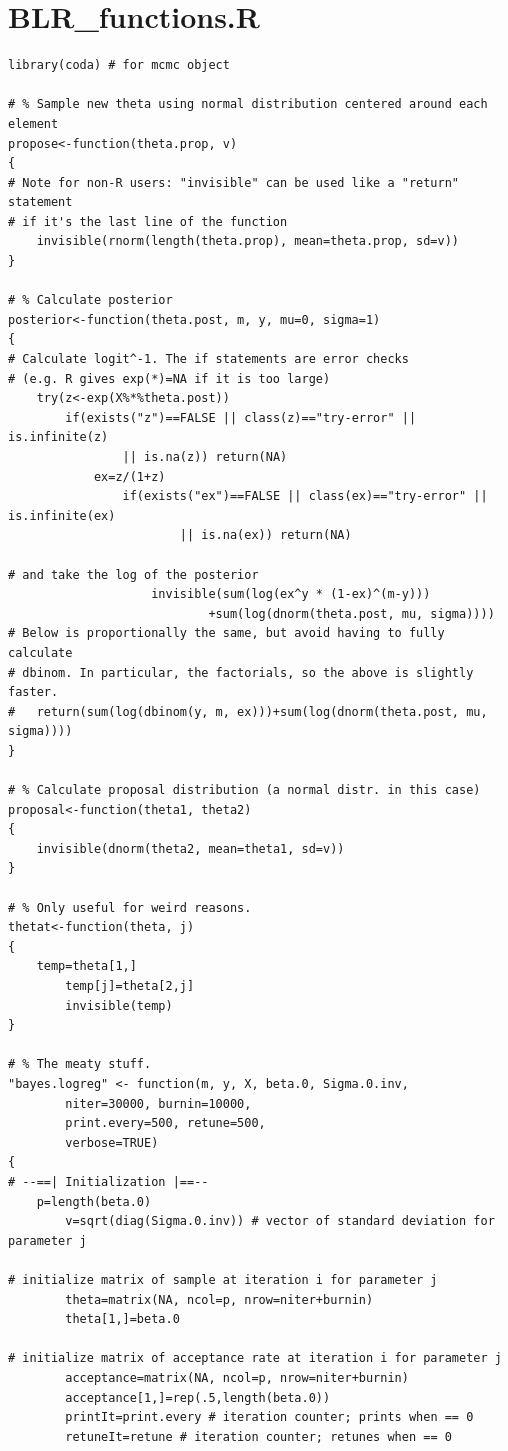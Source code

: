 \documentclass{article}
\begin{document}
\FloatBarrier
\newpage

\section{BLR\_functions.R}

\begin{verbatim}
library(coda) # for mcmc object

# % Sample new theta using normal distribution centered around each element
propose<-function(theta.prop, v)
{
# Note for non-R users: "invisible" can be used like a "return" statement
# if it's the last line of the function
	invisible(rnorm(length(theta.prop), mean=theta.prop, sd=v))
}

# % Calculate posterior
posterior<-function(theta.post, m, y, mu=0, sigma=1)
{
# Calculate logit^-1. The if statements are error checks
# (e.g. R gives exp(*)=NA if it is too large)
	try(z<-exp(X%*%theta.post))
		if(exists("z")==FALSE || class(z)=="try-error" || is.infinite(z)
				|| is.na(z)) return(NA)
			ex=z/(1+z)
				if(exists("ex")==FALSE || class(ex)=="try-error" || is.infinite(ex)
						|| is.na(ex)) return(NA)

# and take the log of the posterior
					invisible(sum(log(ex^y * (1-ex)^(m-y)))
							+sum(log(dnorm(theta.post, mu, sigma))))
# Below is proportionally the same, but avoid having to fully calculate
# dbinom. In particular, the factorials, so the above is slightly faster.
#	return(sum(log(dbinom(y, m, ex)))+sum(log(dnorm(theta.post, mu, sigma))))
}

# % Calculate proposal distribution (a normal distr. in this case)
proposal<-function(theta1, theta2)
{
	invisible(dnorm(theta2, mean=theta1, sd=v))
}

# % Only useful for weird reasons.
thetat<-function(theta, j)
{
	temp=theta[1,]
		temp[j]=theta[2,j]
		invisible(temp)
}

# % The meaty stuff.
"bayes.logreg" <- function(m, y, X, beta.0, Sigma.0.inv,
		niter=30000, burnin=10000,
		print.every=500, retune=500,
		verbose=TRUE)
{
# --==| Initialization |==--
	p=length(beta.0)
		v=sqrt(diag(Sigma.0.inv)) # vector of standard deviation for parameter j

# initialize matrix of sample at iteration i for parameter j
		theta=matrix(NA, ncol=p, nrow=niter+burnin)
		theta[1,]=beta.0

# initialize matrix of acceptance rate at iteration i for parameter j
		acceptance=matrix(NA, ncol=p, nrow=niter+burnin)
		acceptance[1,]=rep(.5,length(beta.0))
		printIt=print.every # iteration counter; prints when == 0
		retuneIt=retune # iteration counter; retunes when == 0



\end{verbatim}
\end{document}
